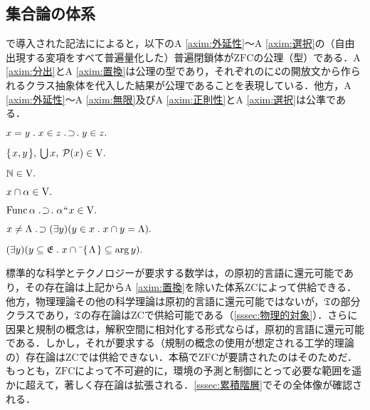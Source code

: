 \subsection{集合論の体系}
\label{ssec:集合論の体系}

で導入された記法にによると，以下のA \ref{axim:外延性}〜A \ref{axim:選択}の（自由出現する変項をすべて普遍量化した）普遍閉鎖体が$\mathrm{ZFC}$の公理（型）である．A \ref{axim:分出}とA \ref{axim:置換}は公理の型であり，それぞれの\kagi{$ \alpha $}に$\mathfrak{L}$の開放文から作られるクラス抽象体を代入した結果が公理であることを表現している．他方，A \ref{axim:外延性}〜A \ref{axim:無限}及びA \ref{axim:正則性}とA \ref{axim:選択}は公準である．

\begin{axim}[外延性]
\label{axim:外延性}
$
    x=y\con{1}x\in z\case{1}{1}{1}y\in z.
$
\end{axim}

\begin{axim}[一対化，和，冪]
\label{axim:一対化，和，冪}
$
    \{\mspace{2mu}x,y\mspace{2mu}\},\:{\textstyle\bigcup}\mspace{3mu}x,\:\mathcal{P}(x)\in\mathrm{V}.
$
\end{axim}

\begin{axim}[無限]
\label{axim:無限}
$
    \mathbb{N}\in\mathrm{V}.
$
\end{axim}

\begin{axim}[分出]
\label{axim:分出}
$
    x\cap\alpha\in\mathrm{V}.
$
\end{axim}

\begin{axim}[置換]
\label{axim:置換}
$
    \func\alpha\case{1}{1}{1}\alpha\img x\in\univ.
$
\end{axim}

\begin{axim}[正則性]
\label{axim:正則性}
$
    x\neq \Lambda {\;.\!}\supset (\exists y)(y\in x{\;.\;}x\cap y=\Lambda).
$
\end{axim}

\begin{axim}[選択]
\label{axim:選択}
$
    (\exists y)(
        y\subseteq\mathfrak{E}\con{1}x\cap\barl{\classab{\Lambda}}\subseteq\arg y
    ).
$
\end{axim}

\noindent 標準的な科学とテクノロジーが要求する数学は，の原初的言語に還元可能であり，その存在論は上記からA \ref{axim:置換}を除いた体系ZCによって供給できる．他方，物理理論その他の科学理論は原初的言語に還元可能ではないが，$\mathfrak{T}$の部分クラスであり，$\mathfrak{T}$の存在論はZCで供給可能である（\ref{sssec:物理的対象}）．さらに因果と規制の概念は，解釈空間に相対化する形式ならば，原初的言語に還元可能である．しかし，それが要求する（規制の概念の使用が想定される工学的理論の）存在論はZCでは供給できない．本稿で$\mathrm{ZFC}$が要請されたのはそのためだ．もっとも，$\mathrm{ZFC}$によって不可避的に，環境の予測と制御にとって必要な範囲を遥かに超えて，著しく存在論は拡張される．\ref{sssec:累積階層}でその全体像が確認される．

